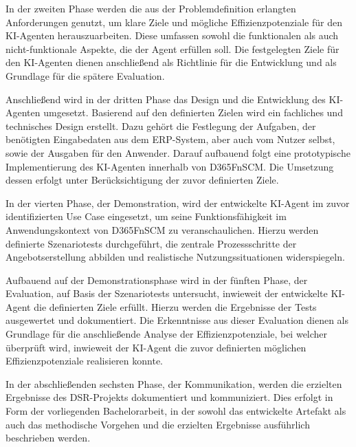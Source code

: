 In der zweiten Phase werden die aus der Problemdefinition erlangten Anforderungen genutzt, um klare Ziele und mögliche Effizienzpotenziale für den \ac{KI}-Agenten herauszuarbeiten. Diese umfassen sowohl die funktionalen als auch nicht-funktionale Aspekte, die der Agent erfüllen soll.
Die festgelegten Ziele für den \ac{KI}-Agenten dienen anschließend als Richtlinie für die Entwicklung und als Grundlage für die spätere Evaluation.

Anschließend wird in der dritten Phase das Design und die Entwicklung des \ac{KI}-Agenten umgesetzt. Basierend auf den definierten Zielen wird ein fachliches und technisches Design erstellt. Dazu gehört die Festlegung der Aufgaben, der benötigten Eingabedaten aus dem \ac{ERP}-System, aber auch vom Nutzer selbst, sowie der Ausgaben für den Anwender. Darauf aufbauend folgt eine prototypische Implementierung des \ac{KI}-Agenten innerhalb von \ac{D365FnSCM}. Die Umsetzung dessen erfolgt unter Berücksichtigung der zuvor definierten Ziele.

In der vierten Phase, der Demonstration, wird der entwickelte \ac{KI}-Agent im zuvor identifizierten Use Case eingesetzt, um seine Funktionsfähigkeit im Anwendungskontext von \ac{D365FnSCM} zu veranschaulichen. Hierzu werden definierte Szenariotests durchgeführt, die zentrale Prozessschritte der Angebotserstellung abbilden und realistische Nutzungssituationen widerspiegeln. 

Aufbauend auf der Demonstrationsphase wird in der fünften Phase, der Evaluation, auf Basis der Szenariotests untersucht, inwieweit der entwickelte \ac{KI}-Agent die definierten Ziele erfüllt. Hierzu werden die Ergebnisse der Tests ausgewertet und dokumentiert. Die Erkenntnisse aus dieser Evaluation dienen als Grundlage für die anschließende Analyse der Effizienzpotenziale, bei welcher überprüft wird, inwieweit der \ac{KI}-Agent die zuvor definierten möglichen Effizienzpotenziale realisieren konnte.

In der abschließenden sechsten Phase, der Kommunikation, werden die erzielten Ergebnisse des \ac{DSR}-Projekts dokumentiert und kommuniziert. Dies erfolgt in Form der vorliegenden Bachelorarbeit, in der sowohl das entwickelte Artefakt als auch das methodische Vorgehen und die erzielten Ergebnisse ausführlich beschrieben werden. 

